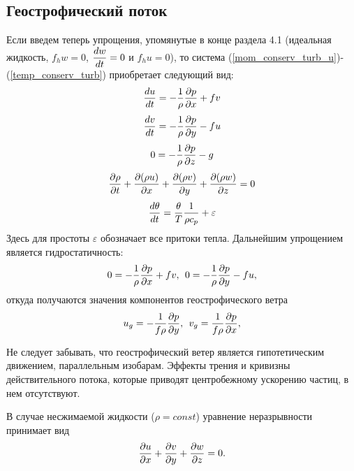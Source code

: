 \subsection{{\color{done}Геострофический поток}}
    Если введем теперь упрощения, упомянутые в конце раздела 4.1 (идеальная жидкость, $f_h w = 0$, $\displaystyle\frac{d w}{d t}=0$ и $f_h u = 0$), то система (\ref{mom_conserv_turb_u})-(\ref{temp_conserv_turb}) приобретает следующий вид:
    \begin{equation}
    \label{eq:DuDt_geost}
        \displaystyle\frac{d u}{d t} = -\frac{1}{\rho}\displaystyle\frac{\partial p}{\partial x}+fv 
    \end{equation} 
    \begin{equation}
    \label{eq:DvDt_geost}
        \displaystyle\frac{d v}{d t} = -\frac{1}{\rho}\displaystyle\frac{\partial p}{\partial y}-fu 
    \end{equation} 
    \begin{equation}
        0 = -\frac{1}{\rho}\displaystyle\frac{\partial p}{\partial z}-g 
    \end{equation} 
    \begin{equation}
        \displaystyle\frac{\partial \rho}{\partial t} + \displaystyle\frac{\partial (\rho u)}{\partial x} + \displaystyle\frac{\partial (\rho v)}{\partial y} + \displaystyle\frac{\partial (\rho w)}{\partial z} = 0 
    \end{equation} 
    \begin{equation}
    \label{eq:DthetaDt}
        \displaystyle\frac{d \theta}{d t} = \frac{\theta}{T} \frac{1}{\rho c_p} + \varepsilon
    \end{equation} 
    Здесь для простоты $\varepsilon$  обозначает все притоки тепла. Дальнейшим упрощением является гидростатичность:
    \begin{equation}
        0 = -\frac{1}{\rho}\displaystyle\frac{\partial p}{\partial x}+fv, \:\: 0 = -\frac{1}{\rho}\displaystyle\frac{\partial p}{\partial y}-fu,  
    \end{equation} 
    откуда получаются значения компонентов геострофического ветра 
    \begin{equation}
        u_g = -\frac{1}{f \rho}\displaystyle\frac{\partial p}{\partial y}, \:\: v_g = \frac{1}{f \rho}\displaystyle\frac{\partial p}{\partial x},  
    \end{equation} 
    \begin{info}
    Не следует забывать, что геострофический ветер является гипотетическим движением, параллельным  изобарам. Эффекты трения и кривизны действительного потока, которые приводят центробежному ускорению частиц, в нем отсутствуют.
    \end{info}

    В случае несжимаемой жидкости ($\rho=const$) уравнение неразрывности принимает вид
    \begin{equation}
        \displaystyle\frac{\partial u}{\partial x}+\displaystyle\frac{\partial v}{\partial y}+\displaystyle\frac{\partial w}{\partial z}=0.  
    \end{equation} 

